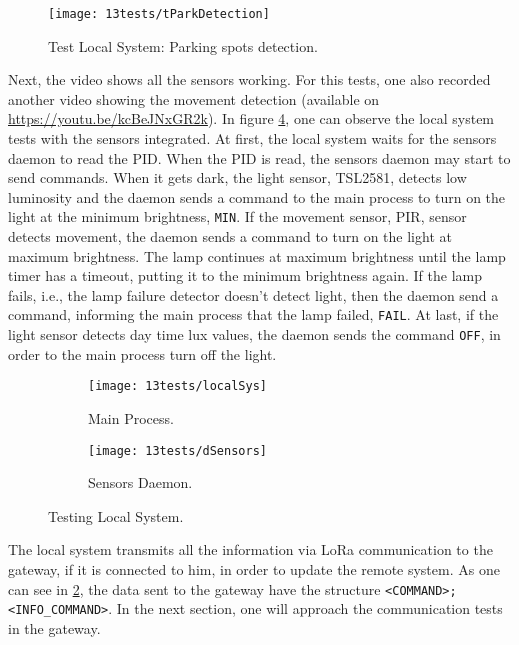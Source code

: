 \begin{figure}[H]
	\centering	
	\texttt{[image: 13tests/tParkDetection]}
	\caption{Test Local System: Parking spots detection.}
	\label{fig:testpark}
\end{figure}

Next, the video shows all the sensors working. For this tests, one also recorded another video showing the movement detection (available on \url{https://youtu.be/kcBeJNxGR2k}). In figure \ref{fig:localSys}, one can observe the local system tests with the sensors integrated. At first, the local system waits for the sensors daemon to read the PID. When the PID is read, the sensors daemon may start to send commands. When it gets dark, the light sensor, TSL2581, detects low luminosity and the daemon sends a command to the main process to turn on the light at the minimum brightness, \verb|MIN|. If the movement sensor, PIR, sensor detects movement, the daemon sends a command to turn on the light at maximum brightness. The lamp continues at maximum brightness until the lamp timer has a timeout, putting it to the minimum brightness again. If the lamp fails, i.e., the lamp failure detector doesn't detect light, then the daemon send a command, informing the main process that the lamp failed, \verb|FAIL|. At last, if the light sensor detects day time lux values, the daemon sends the command \verb|OFF|, in order to the main process turn off the light. 

\begin{figure}[H]
	\centering
	\begin{subfigure}{.5\textwidth}
		\centering	
		\texttt{[image: 13tests/localSys]}
		\caption{Main Process.}
		\label{fig:main}
	\end{subfigure}%
	\begin{subfigure}{.5\textwidth}
		\centering
		\texttt{[image: 13tests/dSensors]}
		\caption{Sensors Daemon.}
		\label{fig:dSensors}
	\end{subfigure}
	\caption{Testing Local System.}
	\label{fig:localSys}
\end{figure}

The local system transmits all the information via LoRa communication to the gateway, if it is connected to him, in order to update the remote system. As one can see in \ref{fig:main}, the data sent to the gateway have the structure \verb|<COMMAND>;<INFO_COMMAND>|. In the next section, one will approach the communication tests in the gateway.

